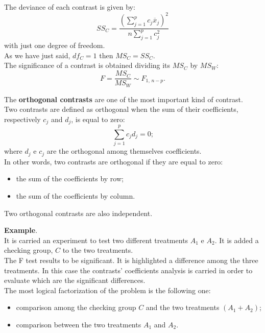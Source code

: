\begin{frame}
  \vspace{.50cm}
  The deviance of each contrast is given by:
  $$ SS_C = \frac{(\sum_{j=1}^p{c_j\overline{x}_j})^2}{n\sum_{j=1}^p{c_j^2}} $$
  with just one degree of freedom.\\
  \vspace*{.25cm}
  As we have just said, $ df_C = 1 $ then $ MS_C = SS_C $.\\
  \vspace*{.50cm}
  The significance of a contrast is obtained dividing its $MS_C$ by $MS_W$:
  $$ F = \frac{MS_C}{MS_W}\sim F_{1,\,n-p} \mbox{.} $$
\end{frame}

\begin{frame}
  The \textbf{orthogonal contrasts} are one of the most important kind of contrast.\\
  Two contrasts are defined as orthogonal when the sum of their coefficients, respectively $c_j$ and $d_j$, is equal to zero:
  $$ \sum_{j=1}^p{c_jd_j} = 0 \mbox{;} $$
  where $ d_j $ e $ c_j $ are the orthogonal among themselves coefficients.\\ 
  \vspace{0.25cm}
  In other words, two contrasts are orthogonal if they are equal to zero:
  \begin{itemize}
    \item the sum of the coefficients by row;
    \item the sum of the coefficients by column.\\
  \end{itemize}
  \vspace{0.5cm}
  Two orthogonal contrasts are also independent.
\end{frame}

\begin{frame}
  \vspace{.5cm}
  \textbf{Example}.\\
  \vspace*{.5cm}
  It is carried an experiment to test two different treatments $A_1$ e $A_2$. It is added a checking group, $C$ to the two treatments.\\
  \vspace*{.5cm}
  The F test results to be significant. It is highlighted a difference among the three treatments. In this case the contrasts' coefficients analysis is carried in order to evaluate which are the significant differences.\\
  \vspace*{.5cm}
  The most logical factorization of the problem is the following one:
  \begin{itemize}
    \item comparison among the checking group $ C $ and the two treatments $ (A_1+A_2) $;
    \item comparison between the two treatments $ A_1 $ and $ A_2 $.
  \end{itemize}
\end{frame}

